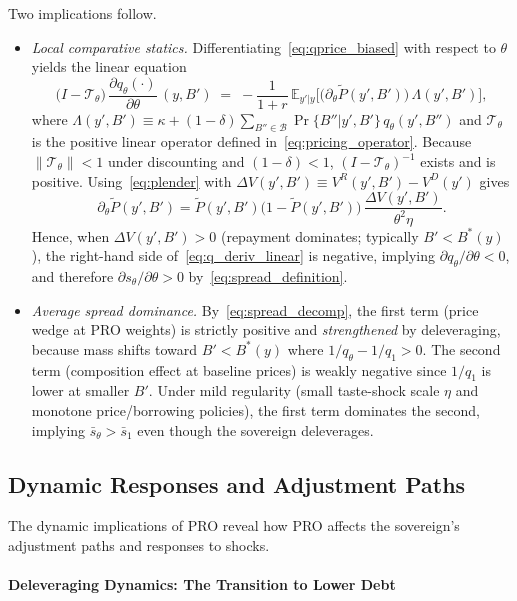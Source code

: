 \documentclass[12pt]{article}
\theoremstyle{plain}
\newcommand{\E}{\mathbb{E}}
\begin{document}
Two implications follow.
\begin{itemize}
	\item \emph{Local comparative statics.} Differentiating~\eqref{eq:qprice_biased} with respect to $\theta$ yields the linear equation
	      \begin{equation}\label{eq:q_deriv_linear}
		      \big(I - \mathcal T_\theta\big)\,\frac{\partial q_\theta(\cdot)}{\partial\theta}\,(y,B') \;=\; -\frac{1}{1+r}\,\E_{y'|y}\Big[\big(\partial_\theta \tilde P(y',B')\big)\,\Lambda(y',B')\Big],
	      \end{equation}
	      where $\Lambda(y',B')\equiv \kappa + (1-\delta)\sum_{B''\in\mathcal B} \Pr\{B''|y',B'\}\,q_\theta(y',B'')$ and $\mathcal T_\theta$ is the positive linear operator defined in~\eqref{eq:pricing_operator}.
	      Because $\|\mathcal T_\theta\|<1$ under discounting and $(1-\delta)<1$,
	      $(I-\mathcal T_\theta)^{-1}$ exists and is positive. Using~\eqref{eq:plender}
	      with $\Delta V(y',B')\equiv V^R(y',B')-V^D(y')$ gives
	      \[\partial_\theta \tilde P(y',B')
		      = \tilde P(y',B')\big(1-\tilde P(y',B')\big)\,\frac{\Delta V(y',B')}{\theta^2\eta}.\]
	      Hence, when $\Delta V(y',B')>0$ (repayment dominates; typically $B'<B^*(y)$),
	      the right-hand side of~\eqref{eq:q_deriv_linear} is negative, implying
	      $\partial q_\theta/\partial\theta<0$, and therefore $\partial
		      s_\theta/\partial\theta>0$ by~\eqref{eq:spread_definition}.
	\item \emph{Average spread dominance.} By~\eqref{eq:spread_decomp}, the first term (price wedge at PRO weights) is strictly positive and \emph{strengthened} by deleveraging, because mass shifts toward $B'<B^*(y)$ where $1/q_\theta - 1/q_1>0$. The second term (composition effect at baseline prices) is weakly negative since $1/q_1$ is lower at smaller $B'$. Under mild regularity (small taste-shock scale $\eta$ and monotone price/borrowing policies), the first term dominates the second, implying $\bar s_\theta>\bar s_1$ even though the sovereign deleverages.
\end{itemize}

\subsection{Dynamic Responses and Adjustment Paths}

The dynamic implications of PRO reveal how PRO affects the sovereign's
adjustment paths and responses to shocks.

\paragraph{Deleveraging Dynamics: The Transition to Lower Debt}
\end{document}

